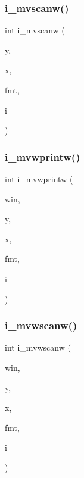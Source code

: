 \mbox{\label{C-macros_8c_a31b17f5fa08e8b64e9b314300f548c33}} 
\subsubsection{\texorpdfstring{i\+\_\+mvscanw()}{i\_mvscanw()}}
{\footnotesize\ttfamily int i\+\_\+mvscanw (\begin{DoxyParamCaption}\item[{int}]{y,  }\item[{int}]{x,  }\item[{char $\ast$}]{fmt,  }\item[{int $\ast$}]{i }\end{DoxyParamCaption})}

\mbox{\label{C-macros_8c_a67cef3b1074a38caaa2f8db9b2f953b5}} 
\subsubsection{\texorpdfstring{i\+\_\+mvwprintw()}{i\_mvwprintw()}}
{\footnotesize\ttfamily int i\+\_\+mvwprintw (\begin{DoxyParamCaption}\item[{W\+I\+N\+D\+OW $\ast$}]{win,  }\item[{int}]{y,  }\item[{int}]{x,  }\item[{const char $\ast$}]{fmt,  }\item[{int}]{i }\end{DoxyParamCaption})}

\mbox{\label{C-macros_8c_ac0518e313ddc0b8e826cfb049c36e257}} 
\subsubsection{\texorpdfstring{i\+\_\+mvwscanw()}{i\_mvwscanw()}}
{\footnotesize\ttfamily int i\+\_\+mvwscanw (\begin{DoxyParamCaption}\item[{W\+I\+N\+D\+OW $\ast$}]{win,  }\item[{int}]{y,  }\item[{int}]{x,  }\item[{char $\ast$}]{fmt,  }\item[{int $\ast$}]{i }\end{DoxyParamCaption})}

